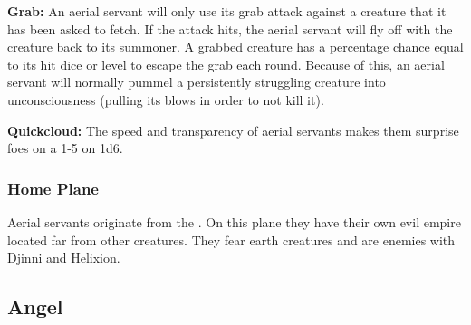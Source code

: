 \begin{multicols*}{2}
\textbf{Grab:} An aerial servant will only use its grab attack against a creature that it has been asked to fetch. If the attack hits, the aerial servant will fly off with the creature back to its summoner. A grabbed creature has a percentage chance equal to its hit dice or level to escape the grab each round. Because of this, an aerial servant will normally pummel a persistently struggling creature into unconsciousness (pulling its blows in order to not kill it).

\textbf{Quickcloud:} The speed and transparency of aerial servants makes them surprise foes on a 1-5 on 1d6.

\subsubsection{Home Plane}
Aerial servants originate from the . On this plane they have their own evil empire located far from other creatures. They fear earth creatures and are enemies with Djinni and Helixion.

\subsection{Angel}


\end{multicols*}
